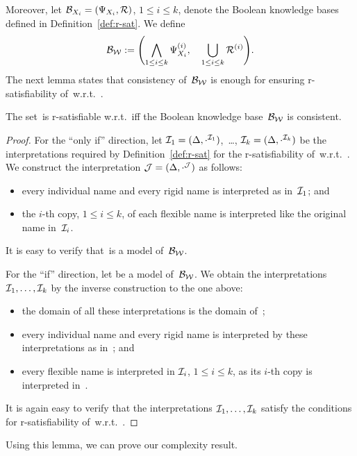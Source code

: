 Moreover, let $\mathcal{B}_{X_i}=(\Psi_{X_i},\mathcal{R})$, $1\le i\le k$, denote the Boolean
knowledge bases defined in Definition~\ref{def:r-sat}.  We define
\[\Bmc_\Wmc:=\Biggl(\bigwedge_{1\le i\le k}\Psi_{X_i}^{(i)},\quad%
    \bigcup_{1\le i\le k}\Rmc^{(i)}\Biggr).\]
%
The next lemma states that consistency of~$\mathcal{B}_\mathcal{W}$ is enough for ensuring
r-satisfiability of~\Wmc w.r.t.~\Rmc.

\begin{lemma}\label{lem:bmc-wmc}
    The set~\Wmc is r-satisfiable w.r.t.~\Rmc iff the Boolean knowledge
    base~$\mathcal{B}_\mathcal{W}$ is consistent.
\end{lemma}

\begin{proof}
    For the \enquote{only if} direction, let
    $\mathcal{I}_1=(\Delta,\cdot^{\mathcal{I}_1})$,~\dots, $\mathcal{I}_k=(\Delta,\cdot^{\mathcal{I}_k})$ be
    the interpretations required by Definition~\ref{def:r-sat} for the
    r-satisfiability of~\Wmc w.r.t.~\Rmc.  We construct the interpretation
    $\mathcal{J}=(\Delta,\cdot^\mathcal{J})$ as follows:
    \begin{itemize}
        \item every individual name and every rigid name is interpreted as
            in~$\mathcal{I}_1$; and
        \item the $i$-th copy, $1\le i\le k$, of each flexible name is
            interpreted like the original name in~$\mathcal{I}_i$.
    \end{itemize}
    It is easy to verify that~\Jmc is a model of~$\mathcal{B}_\mathcal{W}$.

    For the \enquote{if} direction, let \Jmc be a model of~$\mathcal{B}_\mathcal{W}$.
    We obtain the interpretations $\mathcal{I}_1,\dots,\mathcal{I}_k$ by the inverse
    construction to the one above:
    \begin{itemize}
        \item the domain of all these interpretations is the domain of~\Jmc;
        \item every individual name and every rigid name is interpreted by these
            interpretations as in~\Jmc; and
        \item every flexible name is interpreted in $\mathcal{I}_i$, $1\le i\le k$, as
            its $i$-th copy is interpreted in~\Jmc.
    \end{itemize}
    It is again easy to verify that the interpretations $\mathcal{I}_1,\dots,\mathcal{I}_k$
    satisfy the conditions for r-satisfiability of~\Wmc w.r.t.~\Rmc.
\end{proof}

\noindent
Using this lemma, we can prove our complexity result.

